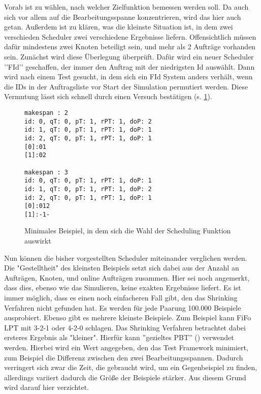 Vorab ist zu wählen, nach welcher Zielfunktion bemessen werden soll. Da auch \cite{Arn99} sich vor allem auf die Bearbeitungsspanne konzentrieren, wird das hier auch getan. Außerdem ist zu klären, was die kleinste Situation ist, in dem zwei verschieden Scheduler zwei verschiedene Ergebnisse liefern. Offensichtlich müssen dafür mindestens zwei Knoten beteiligt sein, und mehr als 2 Aufträge vorhanden sein. Zunächst wird diese Überlegung überprüft. Dafür wird ein neuer Scheduler ’’FId’’ geschaffen, der immer den Auftrag mit der niedrigsten Id auswählt. Dann wird nach einem Test gesucht, in dem sich ein FId System anders verhält, wenn die IDs in der Auftragsliste vor Start der Simulation permutiert werden. Diese Vermutung lässt sich schnell durch einen Versuch bestätigen (s. \ref{minX}).\\
\begin{figure}
\centering
\begin{verbatim}
makespan : 2
id: 0, qT: 0, pT: 1, rPT: 1, doP: 2
id: 1, qT: 0, pT: 1, rPT: 1, doP: 1
id: 2, qT: 0, pT: 1, rPT: 1, doP: 1
[0]:01
[1]:02

makespan : 3
id: 0, qT: 0, pT: 1, rPT: 1, doP: 1
id: 1, qT: 0, pT: 1, rPT: 1, doP: 2
id: 2, qT: 0, pT: 1, rPT: 1, doP: 1
[0]:012
[1]:-1-
\end{verbatim}
\caption{Minimales Beispiel, in dem sich die Wahl der Scheduling Funktion auswirkt}
\label{minX}
\end{figure}

Nun können die bisher vorgestellten Scheduler miteinander verglichen werden. Die "Gestelltheit" des kleinsten Beispiels setzt sich dabei aus der Anzahl an Aufträgen, Knoten, und online Aufträgen zusammen. Hier sei noch angemerkt, dass dies, ebenso wie das Simulieren, keine exakten Ergebnisse liefert. Es ist immer möglich, dass es einen noch einfacheren Fall gibt, den das Shrinking Verfahren nicht gefunden hat. Es werden für jede Paarung 100.000 Beispiele ausprobiert. Ebenso gibt es mehrere kleinste Beispiele. Zum Beispiel kann FiFo LPT mit 
3-2-1 oder 4-2-0 schlagen. Das Shrinking Verfahren betrachtet dabei ersteres Ergebnis als "kleiner". Hierfür kann ''gezieltes PBT'' (\cite{testTarget}) verwendet werden. Hierbei wird ein Wert angegeben, den das Test Framework minimiert, zum Beispiel die Differenz zwischen den zwei Bearbeitungsspannen. Dadurch verringert sich zwar die Zeit, die gebraucht wird, um ein Gegenbeispiel zu finden, allerdings variiert dadurch die Größe der Beispiele stärker. Aus diesem Grund wird darauf hier verzichtet.\\


